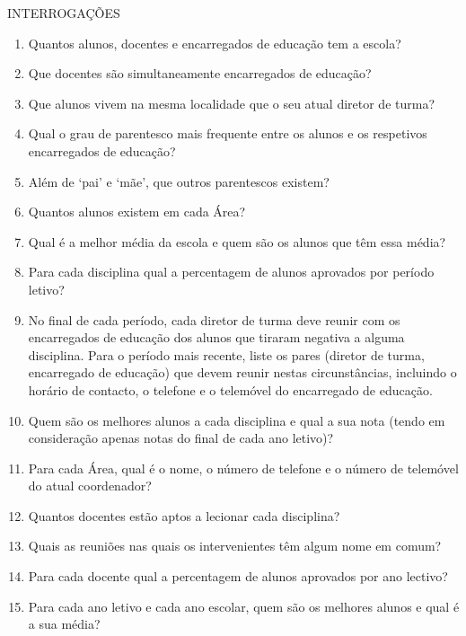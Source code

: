 \documentclass[12pt,a4paper,reqno]{report}
\numberwithin{figure}{section}
\numberwithin{equation}{section}
\begin{document}
INTERROGAÇÕES

\begin{enumerate}
	
	\item Quantos alunos, docentes e encarregados de educação tem a escola?
	
	\item Que docentes são simultaneamente encarregados de educação?
	
	\item Que alunos vivem na mesma localidade que o seu atual diretor de turma?
	
	\item Qual o grau de parentesco mais frequente entre os alunos e os respetivos encarregados de educação?
	
	\item Além de `pai' e `mãe', que outros parentescos existem?
	
	\item Quantos alunos existem em cada Área?
	
	\item Qual é a melhor média da escola e quem são os alunos que têm essa média?
	
	\item Para cada disciplina qual a percentagem de alunos aprovados por período letivo?
	
	\item No final de cada período, cada diretor de turma deve reunir com os encarregados de educação dos alunos que tiraram negativa a alguma disciplina. Para o período mais recente, liste os pares (diretor de turma, encarregado de educação) que devem reunir nestas circunstâncias, incluindo o horário de contacto, o telefone e o telemóvel do encarregado de educação.
	
	\item Quem são os melhores alunos a cada disciplina e qual a sua nota (tendo em consideração apenas notas do final de cada ano letivo)?
	
	\item Para cada Área, qual é o nome, o número de telefone e o número de telemóvel do atual coordenador?
	
	\item Quantos docentes estão aptos a lecionar cada disciplina?
	
	\item Quais as reuniões nas quais os intervenientes têm algum nome em comum?
	
	\item Para cada docente qual a percentagem de alunos aprovados por ano lectivo?
	
	\item Para cada ano letivo e cada ano escolar, quem são os melhores alunos e qual é a sua média?
	
\end{enumerate}
\end{document}
